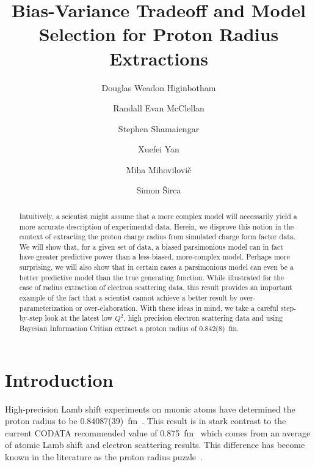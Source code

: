 \documentclass[10pt,aps,prc,twocolumn]{revtex4-1}
\begin{document}
\title{Bias-Variance Tradeoff and Model Selection for Proton Radius Extractions}

\author{Douglas Weadon Higinbotham}
\author{Randall Evan McClellan}
\author{Stephen Shamaiengar}
\author{Xuefei Yan}
\author{Miha Mihovilovi\v{c}}
\author{Simon \v{S}irca}

\begin{abstract}
Intuitively, a scientist might assume that a more complex model will necessarily yield a more 
accurate description of experimental data.   Herein, we disprove this notion in the context of extracting 
the proton charge radius from simulated charge form factor data.  We will show that, for a given set of data, 
a biased parsimonious model can in fact have greater predictive power than a less-biased, more-complex model.  
Perhaps more surprising,
we will also show that in certain cases a parsimonious model can even be a better predictive model 
than the true generating function.   While illustrated for the case of radius extraction of electron scattering data,
this result provides an important example of the fact that a scientist cannot achieve a better result by
over-parameterization or over-elaboration.   With these ideas in mind, we take a careful step-by-step look at the
latest low $Q^2$, high precision electron scattering data and using Bayesian Information Critian extract a proton 
radius of 0.842(8)~fm.
\end{abstract}

\maketitle

\section{Introduction}

High-precision Lamb shift experiments on muonic atoms have determined the proton radius to 
be 0.84087(39)~fm~\cite{Pohl:2010zza,Antognini:1900ns}.   This result is in stark contrast to the current
CODATA recommended value of 0.875~fm~\cite{Mohr:2015ccw} which comes from an average of atomic 
Lamb shift and electron scattering results.    This difference has become known in the literature as
the proton radius puzzle~\cite{Pohl:2013yb}.
\end{document}
